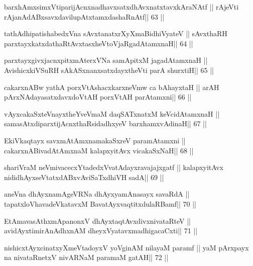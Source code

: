 \begin{shl}
barxhAmxsimxVtiparijAcnxnadhavxsatxdhAvxnatxtavxkAraNAtf ||
rAjeVti rAjanAdABxsavxdavilupAtxtamxdashaRnAtf\hfill || 63 ||
\end{shl}

\begin{shl}
tathA\s dhipatishabedxVna sAvxtanatxrXyXmaBidhiVyateV ||
sAvxthaRH parxtayxkatxdathaRtAvxtasxheVtoVjaRgadAtamxnaH\hfill || 64 ||
\end{shl}

\begin{shl}
parxtayxgivxjacnxpitxmAterxVNa samApitxM jagadAtamxnaH ||
AvishicxkiVSuRH sAkASxnanxsatxdayxtheVti parA shurxtiH\hfill || 65 ||
\end{shl}

\begin{shl}
cakarxnABw yathA porxVtAshacxkarxneVmw ca bAhayxtaH ||
arAH pArxNAdayasatxdavxdoVtAH porxVtAH parAtamxni\hfill || 66 ||
\end{shl}

\begin{shl}
vAyxcakaSxteV\s nayxtheYveVmaM daqSATxnatxM keVcidAtamxnaH ||
samasAtxdiparxtijAcnxthaRsidadhxyeV barxhamxvAdinaH\hfill || 67 ||
\end{shl}

\begin{shl}
EkiVkaqtayx savxmAtAmxnamakaSxreV paramAtamxni ||
cakarxnABivadAtAmxnaM kalapxyitAvx vicakaSxNaH\hfill || 68 ||
\end{shl}

\begin{shl}
shariVraM neVmivacecxYtadedxVvatAdayxravajajxgatf ||
kalapxyitAvx nididhAyxseVtatxdABxvAviSaTxdhiVH sadA\hfill || 69 ||
\end{shl}

\begin{shl}
aneVna dhAyxnamAgeVRNa dhAyxyamAnasayx savaRdA ||
tapatxloVhavadeVkatavxM BavatAyxvaqtitxdulaRBamf\hfill || 70 ||
\end{shl}

\begin{shl}
EtAmavasAthxmApanonxV dhAyxtaqtAvxdivxnivataRteV ||
avidAyxtimirAnAdhxnAM dheyxVyatavxmadhigacaCxti\hfill || 71 ||
\end{shl}

\begin{shl}
nishicxtAyxcinatxyXmeVtadoyxV yoVginAM nilayaM paramf ||
yaM pArxpayx na nivataRnetxV nivARNaM paramaM gatAH\hfill || 72 ||
\end{shl}

